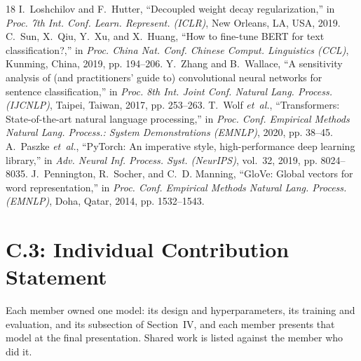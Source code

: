 \documentclass[conference,onecolumn,a4paper,10pt]{IEEEtran}
\begin{document}
\begin{thebibliography}{18}
I.~Loshchilov and F.~Hutter, ``Decoupled weight decay regularization,'' in \emph{Proc. 7th Int. Conf. Learn. Represent. (ICLR)}, New Orleans, LA, USA, 2019.
C.~Sun, X.~Qiu, Y.~Xu, and X.~Huang, ``How to fine-tune {BERT} for text classification?,'' in \emph{Proc. China Nat. Conf. Chinese Comput. Linguistics (CCL)}, Kunming, China, 2019, pp. 194--206.
Y.~Zhang and B.~Wallace, ``A sensitivity analysis of (and practitioners' guide to) convolutional neural networks for sentence classification,'' in \emph{Proc. 8th Int. Joint Conf. Natural Lang. Process. (IJCNLP)}, Taipei, Taiwan, 2017, pp. 253--263.
T.~Wolf \emph{et~al.}, ``Transformers: State-of-the-art natural language processing,'' in \emph{Proc. Conf. Empirical Methods Natural Lang. Process.: System Demonstrations (EMNLP)}, 2020, pp. 38--45.
A.~Paszke \emph{et~al.}, ``{PyTorch}: An imperative style, high-performance deep learning library,'' in \emph{Adv. Neural Inf. Process. Syst. (NeurIPS)}, vol.~32, 2019, pp. 8024--8035.
J.~Pennington, R.~Socher, and C.~D. Manning, ``{GloVe}: Global vectors for word representation,'' in \emph{Proc. Conf. Empirical Methods Natural Lang. Process. (EMNLP)}, Doha, Qatar, 2014, pp. 1532--1543.
\end{thebibliography}

\clearpage
\section*{C.3: Individual Contribution Statement}
Each member owned one model: its design and hyperparameters, its training and evaluation, and its subsection of Section~IV, and each member presents that model at the final presentation. Shared work is listed against the member who did it.
\end{document}
